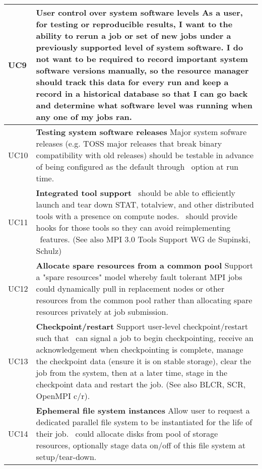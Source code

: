 \begin{longtable}{|p{1cm}|p{15cm}|}
  \hline
  UC9 & \textbf{User control over system software levels}\newline
	As a user, for testing or reproducible results, I want to the ability
	to rerun a job or set of new jobs under a previously supported level
	of system software. I do not want to be required to record important
	system software versions manually, so the resource manager should
	track this data for every run and keep a record in a historical
	database so that I can go back and determine what software level
	was running when any one of my jobs ran.\\
  \hline
  UC10 & \textbf{Testing system software releases}\newline
	Major system sofware releases (e.g. TOSS major releases that break
	binary compatibility with old releases) should be testable in advance
	of being configured as the default through \ngrm\ option at run time.\\
  \hline
  UC11 & \textbf{Integrated tool support}\newline
	\ngrm\ should be able to efficiently launch and tear down STAT,
	totalview, and other distributed tools with a presence on compute
	nodes. \ngrm\ should provide hooks for those tools so they can avoid
	reimplementing \ngrm\ features. (See also MPI 3.0 Tools Support WG de
	Supinski, Schulz)\\
  \hline
  UC12 & \textbf{Allocate spare resources from a common pool}\newline
	Support a "spare resources" model whereby fault tolerant MPI jobs
	could dynamically pull in replacement nodes or other resources from
	the common pool rather than allocating spare resources privately at
	job submission.\\
  \hline
  UC13 & \textbf{Checkpoint/restart}\newline
	Support user-level checkpoint/restart such that \ngrm\ can signal a
	job to begin checkpointing, receive an acknowledgement when
	checkpointing is complete, manage the checkpoint data (ensure it is
	on stable storage), clear the job from the system, then at a later
	time, stage in the checkpoint data and restart the job. (See also
	BLCR, SCR, OpenMPI c/r).\\
  \hline
  UC14 & \textbf{Ephemeral file system instances}\newline
	Allow user to request a dedicated parallel file system to be
	instantiated for the life of their job. \ngrm\ could allocate disks
	from pool of storage resources, optionally stage data on/off of this
	file system at setup/tear-down.\\

\end{longtable}

